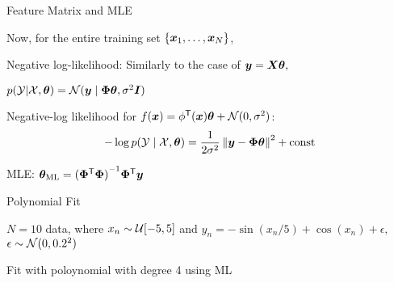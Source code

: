 \documentclass[handout,fleqn,aspectratio=169]{beamer}
\begin{document}
\begin{frame}{Feature Matrix and MLE}

\plitemsep 0.15in

\bci 

\item Now, for the entire training set $\{\bm{x}_1, \ldots, \bm{x}_N \}$, 
\item Negative log-likelihood: Similarly to the case of $\bm{y} = \bm{X} \bm{\theta},$
\mycolorbox
{
\bci
\item $p(\mathcal Y| \mathcal X,\bm{\theta}) = \mathcal N(\bm{y} \mid \bm{\Phi}\bm{\theta}, \sigma^2\bm{I})$
\item Negative-log likelihood for $f(\bm{x}) = {\phi}^{\mathsf{T}}(\bm{x})\bm{\theta} + \mathcal N(0,\sigma^2)$: 
\vspace{-0.1cm}
$$
-\log p({\cal Y} \mid {\cal X}, \bm{\theta}) = \dfrac{1}{2\sigma^2} \left \lVert \bm{y} - \bm{\Phi}\bm{\theta} \right \rVert^2 + \text{const}
$$
\eci
}



\item MLE:
$
\bm{\theta}_{\text{ML}} = {{({\bm{\Phi}}^{\mathsf{T}}\bm{\Phi})}^{-1}} {\bm{\Phi}}^{\mathsf{T}} \bm{y}
$
\eci
\end{frame}

\begin{frame}{Polynomial Fit}

\plitemsep 0.07in

\bci 

\item $N=10$ data, where $x_n \sim \mathcal U[-5,5]$ and $y_n = -\sin(x_n/5) + \cos(x_n) + \epsilon,$ $\epsilon \sim \mathcal N(0,0.2^2)$

\item Fit with poloynomial with degree 4 using ML
\eci


\end{frame}
\end{document}

